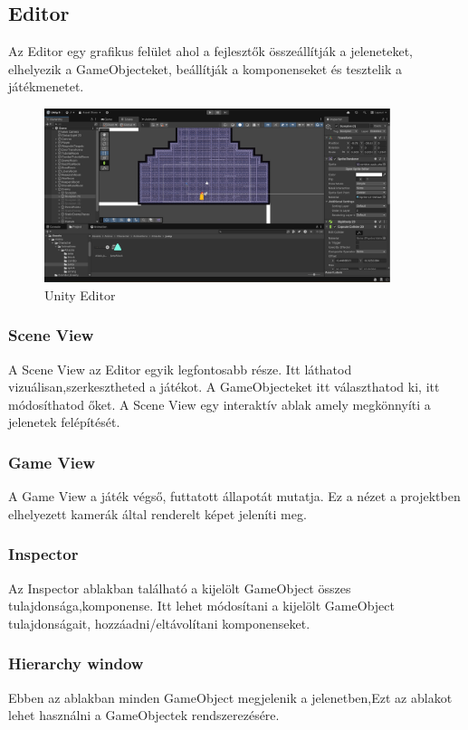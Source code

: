 \documentclass[
]{thesis-ekf}
\theoremstyle{definition}
\theoremstyle{remark}
\begin{document}
\subsection{Editor}
Az Editor egy grafikus felület ahol a fejlesztők összeállítják a jeleneteket, elhelyezik a GameObjecteket, beállítják a komponenseket és tesztelik a játékmenetet.

\begin{figure}[h!]
	\centering
	\includegraphics[width=0.9\textwidth]{UnityEditorKep.png}
	\caption{Unity Editor}
	\label{fig:unityEditor}
\end{figure}

\subsubsection{Scene View}
A Scene View az Editor egyik legfontosabb része. Itt láthatod vizuálisan,szerkesztheted a játékot. A GameObjecteket itt választhatod ki, itt módosíthatod őket. A Scene View egy interaktív ablak amely megkönnyíti a jelenetek felépítését.\cite{UnityScene}
\subsubsection{Game View}
A Game View a játék végső, futtatott állapotát mutatja. Ez a nézet a projektben elhelyezett kamerák által renderelt képet jeleníti meg.\cite{UnityGameView}

\subsubsection{Inspector}
Az Inspector ablakban található a kijelölt GameObject összes tulajdonsága,komponense. Itt lehet módosítani a kijelölt GameObject tulajdonságait, hozzáadni/eltávolítani komponenseket.\cite{UnityIspector}

\subsubsection{Hierarchy window}
Ebben az ablakban minden GameObject megjelenik a jelenetben,Ezt az ablakot lehet használni a GameObjectek rendszerezésére.\cite{UnityIspector}
\end{document}
